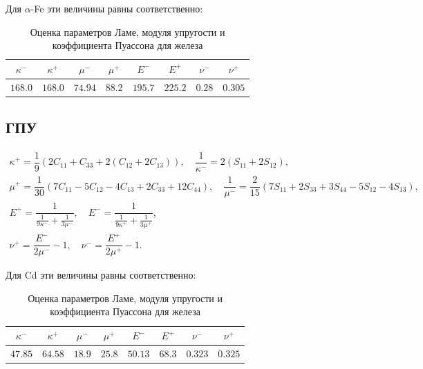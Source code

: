 \documentclass[12pt,a4paper]{article}
\begin{document}
 Для $\alpha$-Fe эти величины равны соответственно:
 \begin{table}[h!]
    \centering
    \begin{tabular}{|c|c|c|c|c|c|c|c|}
        \hline 
        $\kappa^-$ & $\kappa^+$ & $\mu^-$ & $\mu^+$ & $E^-$ & $E^+$ & $\nu^-$ & $\nu^+$ \\
        \hline 
        $168.0$ & $168.0$ & $74.94$ & $88.2$ & $195.7$ & $225.2$ & $0.28$ & $0.305$ \\
        \hline
    \end{tabular}
    \vspace{3mm}
    \caption{Оценка параметров Ламе, модуля упругости и коэффициента Пуассона для железа}
 \end{table}

 \subsection{ГПУ}
 \begin{gather*}
    \kappa^+ = \dfrac{1}{9}(2C_{11} + C_{33} + 2(C_{12} + 2C_{13})), \quad \dfrac{1}{\kappa^-} = 2(S_{11} + 2S_{12}),
    \\[0.7em]
    \mu^+ = \dfrac{1}{30}(7C_{11} - 5C_{12} - 4C_{13} + 2C_{33} + 12C_{44}), \quad \dfrac{1}{\mu^-} = \dfrac{2}{15}(7S_{11} + 2S_{33} + 3S_{44} - 5S_{12} - 4S_{13}),
    \\[0.7em]
    E^+ = \dfrac{1}{\tfrac{1}{9 \kappa^-} + \tfrac{1}{3\mu^-}}, \quad E^- = \dfrac{1}{\tfrac{1}{9 \kappa^+} + \tfrac{1}{3\mu^+}},
    \\[0.7em]
    \nu^+ = \dfrac{E^-}{2\mu^-} - 1, \quad \nu^- = \dfrac{E^+}{2\mu^+} - 1.
 \end{gather*}

 \pagebreak

 Для Cd эти величины равны соответственно: 
 \begin{table}[h!]
    \centering
    \begin{tabular}{|c|c|c|c|c|c|c|c|}
        \hline 
        $\kappa^-$ & $\kappa^+$ & $\mu^-$ & $\mu^+$ & $E^-$ & $E^+$ & $\nu^-$ & $\nu^+$ \\
        \hline 
        $47.85$ & $64.58$ & $18.9$ & $25.8$ & $50.13$ & $68.3$ & $0.323$ & $0.325$ \\
        \hline
    \end{tabular}
    \vspace{3mm}
    \caption{Оценка параметров Ламе, модуля упругости и коэффициента Пуассона для железа}
 \end{table}
\end{document}
